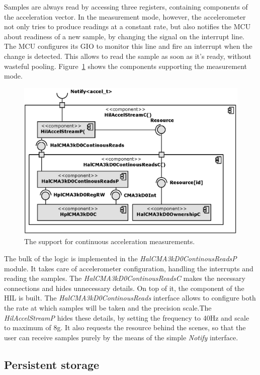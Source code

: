 Samples are always read by accessing three registers, containing components of the acceleration vector. In the measurement mode, however, the accelerometer not only tries to produce readings at a constant rate, but also notifies the MCU about readiness of a new sample, by changing the signal on the interrupt line. The MCU configures its GIO to monitor this line and fire an interrupt when the change is detected. This allows to read the sample as soon as it's ready, without wasteful pooling. Figure~\ref{fig:hil_accel_stream_c} shows the components supporting the measurement mode.
\begin{figure}[h]
  \centering
  \includegraphics{diagrams/hil_accel_stream_c.eps}
  \caption{The support for continuous acceleration measurements.}
  \label{fig:hil_accel_stream_c}
\end{figure}

The bulk of the logic is implemented in the \emph{HalCMA3kD0ContinousReadsP} module. It takes care of accelerometer configuration, handling the interrupts and reading the samples. The \emph{HalCMA3kD0ContinousReadsC} makes the necessary connections and hides unnecessary details. On top of it, the component of the HIL is built. The \emph{HalCMA3kD0ContinousReads} interface allows to configure both the rate at which samples will be taken and the precision scale.The \emph{HilAccelStreamP} hides these details, by setting the frequency to 40Hz and scale to maximum of 8g. It also requests the resource behind the scenes, so that the user can receive samples purely by the means of the simple \emph{Notify} interface.

\subsection{Persistent storage}

